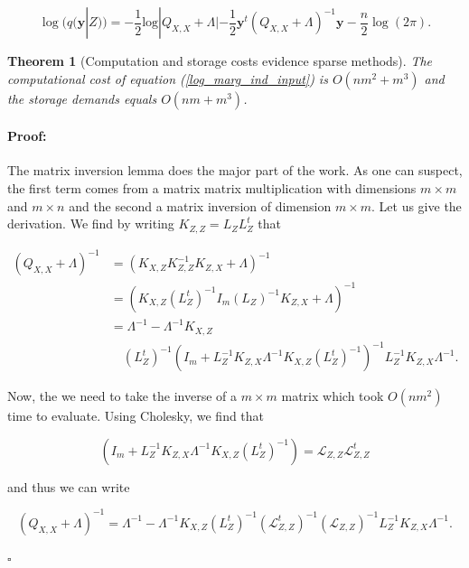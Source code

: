 \documentclass[12pt,a4paper,oneside]{book}
\newtheorem{Theorem}{Theorem}
\newenvironment{proof}{\paragraph{Proof:}}{\hfill$\square$}
\begin{document}
\begin{equation}\label{log_marg_ind_input}
\log ( q(\bm{y}|Z)) = -\dfrac{1}{2} \text{log}|Q_{X,X}+\Lambda| - \dfrac{1}{2} \bm{y}^t (Q_{X,X} + \Lambda)^{-1} \bm{y} - \dfrac{n}{2} \log{(2\pi)}.
\end{equation}


\begin{Theorem}[Computation and storage costs evidence sparse methods]\label{time_compl_evid_approx}
The computational cost of equation (\ref{log_marg_ind_input}) is $O(nm^2 + m^3)$ and the storage demands equals $O(nm + m^3)$.
\end{Theorem}

\begin{proof}
The matrix inversion lemma does the major part of the work. As one can suspect, the first term comes from a matrix matrix multiplication with dimensions $m \times m$ and $m \times n$ and the second a matrix inversion of dimension $m \times m$.  Let us give the derivation. We find by  writing $K_{Z,Z} = L_{Z}  L_{Z}^t$ that 

\begin{equation}
\begin{aligned}
(Q_{X,X} + \Lambda) ^{-1} &= (K_{X,Z} K_{Z,Z}^{-1} K_{Z,X} + \Lambda)^{-1}  \\
&= (K_{X,Z}  (L_{Z}^t)^{-1} I_m (L_{Z})^{-1} K_{Z,X} + \Lambda)^{-1}  \\
&= \Lambda^{-1} - \Lambda^{-1} K_{X,Z} \\ 
& \quad (L_{Z}^t)^{-1} ( I_m + L_{Z}^{-1} K_{Z,X} \Lambda^{-1} K_{X,Z} (L_{Z}^t)^{-1} )^{-1} L_{Z}^{-1} K_{Z,X} \Lambda^{-1}.
\end{aligned}
\end{equation}

Now, the we need to take the inverse of a $m \times m$ matrix which took $O(nm^2)$ time to evaluate. Using Cholesky, we find that 

\begin{equation}\label{Sparse_efficient_cal}
( I_m + L_{Z}^{-1} K_{Z,X} \Lambda^{-1} K_{X,Z} (L_{Z}^t)^{-1} ) = \mathcal{L}_{Z,Z} \mathcal{L}_{Z,Z}^t
\end{equation}

and thus we can write 

\begin{equation}
(Q_{X,X} + \Lambda) ^{-1} =  \Lambda^{-1} - \Lambda^{-1} K_{X,Z}(L_{Z}^t)^{-1} (\mathcal{L}_{Z,Z}^t)^{-1} (\mathcal{L}_{Z,Z})^{-1}  L_{Z}^{-1} K_{Z,X} \Lambda^{-1}.
\end{equation}


\end{proof}
\end{document}
